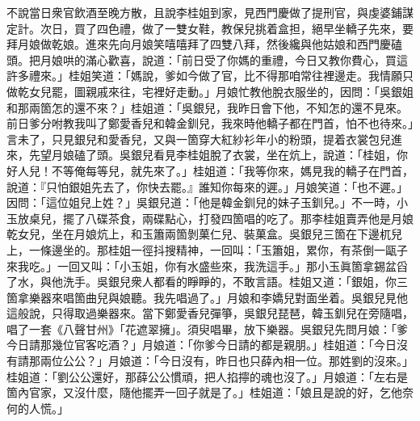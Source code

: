 不說當日衆官飲酒至晚方散，且說李桂姐到家，見西門慶做了提刑官，與虔婆鋪謀定計。次日，買了四色禮，做了一雙女鞋，教保兒挑着盒担，絕早坐轎子先來，要拜月娘做乾娘。進來先向月娘笑嘻嘻拜了四雙八拜，然後纔與他姑娘和西門慶磕頭。{}把月娘哄的滿心歡喜，說道：「前日受了你媽的重禮，今日又教你費心，買這許多禮來。」桂姐笑道：「媽說，爹如今做了官，比不得那咱常往裡邊走。我情願只做乾女兒罷，圖親戚來往，宅裡好走動。」月娘忙教他脫衣服坐的，因問：「吳銀姐和那兩箇怎的還不來？」桂姐道：「吳銀兒，我昨日會下他，不知怎的還不見來。前日爹分咐教我叫了鄭愛香兒和韓金釧兒，我來時他轎子都在門首，怕不也待來。」言未了，只見銀兒和愛香兒，又與一箇穿大紅紗衫年小的粉頭，提着衣裳包兒進來，先望月娘磕了頭。吳銀兒看見李桂姐脫了衣裳，坐在炕上，說道：「桂姐，你好人兒！不等俺每等兒，就先來了。」桂姐道：「我等你來，媽見我的轎子在門首，說道：『只怕銀姐先去了，你快去罷。』誰知你每來的遲。」月娘笑道：「也不遲。」因問：「這位姐兒上姓？」吳銀兒道：「他是韓金釧兒的妹子玉釧兒。」不一時，小玉放桌兒，擺了八碟茶食，兩碟點心，打發四箇唱的吃了。那李桂姐賣弄他是月娘乾女兒，坐在月娘炕上，和玉簫兩箇剝菓仁兒、裝菓盒。吳銀兒三箇在下邊杌兒上，一條邊坐的。那桂姐一徑抖搜精神，一回叫：「玉簫姐，累你，有茶倒一甌子來我吃。」一回又叫：「小玉姐，你有水盛些來，我洗這手。」那小玉眞箇拿錫盆舀了水，與他洗手。吳銀兒衆人都看的睜睜的，不敢言語。桂姐又道：「銀姐，你三箇拿樂器來唱箇曲兒與娘聽。我先唱過了。」{}月娘和李嬌兒對面坐着。吳銀兒見他這般說，只得取過樂器來。當下鄭愛香兒彈箏，吳銀兒琵琶，韓玉釧兒在旁隨唱，唱了一套《八聲甘州》「花遮翠擁」。須臾唱畢，放下樂器。吳銀兒先問月娘：「爹今日請那幾位官客吃酒？」月娘道：「你爹今日請的都是親朋。」桂姐道：「今日沒有請那兩位公公？」月娘道：「今日沒有，昨日也只薛內相一位。那姓劉的沒來。」桂姐道：「劉公公還好，那薛公公慣頑，把人掐擰的魂也沒了。」月娘道：「左右是箇內官家，又沒什麼，{}隨他擺弄一回子就是了。」桂姐道：「娘且是說的好，乞他奈何的人慌。」

